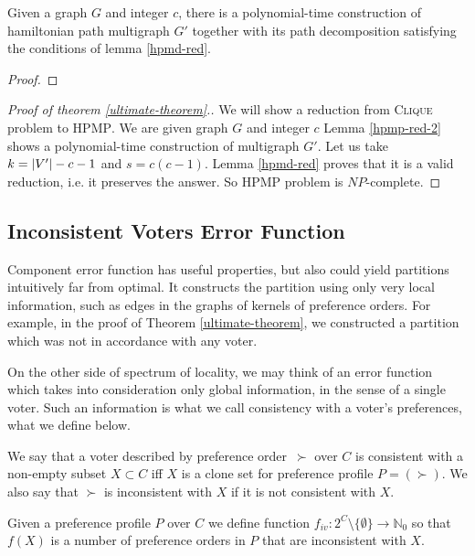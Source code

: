 \begin{lmm}
Given a graph $G$ and integer $c$, there is a polynomial-time construction
of hamiltonian path multigraph $G'$ together with its path decomposition
satisfying the conditions of lemma \ref{hpmd-red}.
\end{lmm}

\begin{proof}
\end{proof}

\begin{proof}[Proof of theorem \ref{ultimate-theorem}.]
We will show a reduction from \textsc{Clique} problem to \textsc{HPMP}.
We are given graph $G$ and integer $c$
Lemma \ref{hpmp-red-2} shows a polynomial-time construction of multigraph $G'$.
Let us take $k=\left\vert V' \right\vert-c-1$ and $s=c(c-1)$.
Lemma \ref{hpmd-red} proves that it is a valid reduction, i.e. it preserves the answer.
So \textsc{HPMP} problem is $NP$-complete.
\end{proof}


\subsection{Inconsistent Voters Error Function}

Component error function has useful properties, but also could yield partitions
intuitively far from optimal.
It constructs the partition using only very local information,
such as edges in the graphs of kernels of preference orders.
For example, in the proof of Theorem \ref{ultimate-theorem}, we constructed a partition
which was not in accordance with any voter.

On the other side of spectrum of locality, we may think of an error function which
takes into consideration only global information, in the sense of a single voter.
Such an information is what we call consistency with a voter's preferences, what we define below.

\begin{defn}
We say that a voter described by preference order~$\succ$ over $C$
is consistent with a non-empty subset $X \subset C$
iff $X$ is a clone set for preference profile $P = (\succ)$.
We also say that $\succ$ is inconsistent with $X$ if it is not consistent with $X$.
\end{defn}

\begin{defn}
Given a preference profile $P$ over $C$ we define function
$f_{iv}: 2^C \setminus \{\emptyset\} \rightarrow \mathbb{N}_0$ so that
$f(X)$ is a number of preference orders in $P$ that are inconsistent with $X$.
\end{defn}

